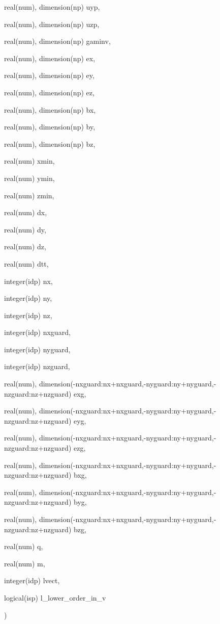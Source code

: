 {\begin{DoxyParamCaption}
\item[{real(num), dimension(np)}]{uyp, }
\item[{real(num), dimension(np)}]{uzp, }
\item[{real(num), dimension(np)}]{gaminv, }
\item[{real(num), dimension(np)}]{ex, }
\item[{real(num), dimension(np)}]{ey, }
\item[{real(num), dimension(np)}]{ez, }
\item[{real(num), dimension(np)}]{bx, }
\item[{real(num), dimension(np)}]{by, }
\item[{real(num), dimension(np)}]{bz, }
\item[{real(num)}]{xmin, }
\item[{real(num)}]{ymin, }
\item[{real(num)}]{zmin, }
\item[{real(num)}]{dx, }
\item[{real(num)}]{dy, }
\item[{real(num)}]{dz, }
\item[{real(num)}]{dtt, }
\item[{integer(idp)}]{nx, }
\item[{integer(idp)}]{ny, }
\item[{integer(idp)}]{nz, }
\item[{integer(idp)}]{nxguard, }
\item[{integer(idp)}]{nyguard, }
\item[{integer(idp)}]{nzguard, }
\item[{real(num), dimension(-\/nxguard\+:nx+nxguard,-\/nyguard\+:ny+nyguard,-\/nzguard\+:nz+nzguard)}]{exg, }
\item[{real(num), dimension(-\/nxguard\+:nx+nxguard,-\/nyguard\+:ny+nyguard,-\/nzguard\+:nz+nzguard)}]{eyg, }
\item[{real(num), dimension(-\/nxguard\+:nx+nxguard,-\/nyguard\+:ny+nyguard,-\/nzguard\+:nz+nzguard)}]{ezg, }
\item[{real(num), dimension(-\/nxguard\+:nx+nxguard,-\/nyguard\+:ny+nyguard,-\/nzguard\+:nz+nzguard)}]{bxg, }
\item[{real(num), dimension(-\/nxguard\+:nx+nxguard,-\/nyguard\+:ny+nyguard,-\/nzguard\+:nz+nzguard)}]{byg, }
\item[{real(num), dimension(-\/nxguard\+:nx+nxguard,-\/nyguard\+:ny+nyguard,-\/nzguard\+:nz+nzguard)}]{bzg, }
\item[{real(num)}]{q, }
\item[{real(num)}]{m, }
\item[{integer(idp)}]{lvect, }
\item[{logical(isp)}]{l\+\_\+lower\+\_\+order\+\_\+in\+\_\+v}
\end{DoxyParamCaption}
)}\hypertarget{particles__push_8_f90_a87ad05cb46ac948188f2738ca82ab6a3}{}\label{particles__push_8_f90_a87ad05cb46ac948188f2738ca82ab6a3}


